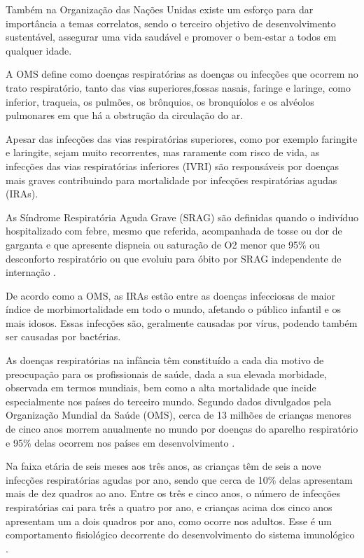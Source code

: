 \documentclass[journal]{IEEEtran}
\begin{document}
Também na Organização das Nações Unidas existe um esforço para dar importância a temas correlatos, sendo o terceiro objetivo de desenvolvimento sustentável, assegurar uma vida saudável e promover o bem-estar a todos em qualquer idade.

A OMS define como doenças respiratórias as doenças ou infecções que ocorrem no trato respiratório, tanto das vias superiores,fossas nasais, faringe e laringe, como inferior, traqueia, os pulmões, os brônquios, os bronquíolos e os alvéolos pulmonares em que há a obstrução da circulação do ar.

Apesar das infecções das vias respiratórias superiores, como por exemplo faringite e laringite, sejam muito recorrentes, mas raramente com risco  de vida, as infecções das vias respiratórias inferiores (IVRI) são responsáveis por doenças mais graves contribuindo para mortalidade por infecções respiratórias agudas (IRAs).

As Síndrome Respiratória Aguda Grave (SRAG) são definidas quando o indivíduo hospitalizado com febre, mesmo que referida, acompanhada de tosse ou dor de garganta e que apresente dispneia ou saturação de O2 menor que 95\% ou desconforto respiratório ou que evoluiu para óbito por SRAG independente de internação \cite{definicao}.

De acordo como a OMS, as IRAs estão entre as doenças infecciosas de maior índice de morbimortalidade em todo o mundo, afetando o público infantil e os mais idosos. Essas infecções são, geralmente causadas por vírus, podendo também ser causadas por bactérias.

As doenças respiratórias na infância têm constituído a cada dia motivo de preocupação para os profissionais de saúde, dada a sua elevada morbidade, observada em termos mundiais, bem como a alta mortalidade que incide especialmente nos países do terceiro mundo. Segundo dados divulgados pela Organização Mundial da Saúde (OMS), cerca de 13 milhões de crianças menores de cinco anos morrem anualmente no mundo por doenças do aparelho respiratório e 95\% delas ocorrem nos países em desenvolvimento \cite{infantil}.

Na faixa etária de seis meses aos três anos, as crianças têm de seis a nove infecções respiratórias agudas por ano, sendo que  cerca  de  10\%  delas  apresentam  mais  de  dez  quadros  ao  ano.  Entre  os  três  e  cinco  anos,  o  número  de  infecções  respiratórias cai para três a quatro por ano, e crianças acima dos cinco anos apresentam um a dois quadros por ano, como ocorre nos adultos. Esse é um comportamento fisiológico decorrente do desenvolvimento do sistema imunológico \cite{infeccao}.
\end{document}
